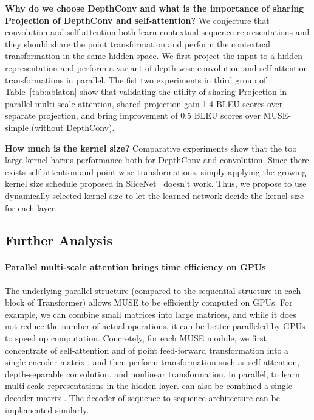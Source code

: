 \documentclass{article} \usepackage{iclr2020_conference,times}
\begin{document}
\textbf{Why do we choose DepthConv and what is the importance of sharing Projection of DepthConv and self-attention?}
We conjecture that convolution and self-attention both learn contextual sequence representations and they should share the point  transformation and perform the contextual transformation in the same hidden space. 
We first project  the input to a hidden representation  and perform a variant of  depth-wise convolution and self-attention transformations in parallel.  
The fist two experiments in third group of Table~\ref{tab:ablaton} show that  validating the utility of sharing Projection in parallel multi-scale attention, shared projection gain 1.4 BLEU scores over separate projection, and bring improvement of 0.5 BLEU scores over MUSE-simple (without DepthConv).

\textbf{How much is the kernel size?}
Comparative experiments show that the too large kernel harms performance  both for DepthConv and convolution. Since there exists self-attention and point-wise transformations, simply applying the growing kernel size schedule proposed in SliceNet~\citep{kaiser2017depthwise}  doesn't  work. Thus, we propose to use dynamically selected kernel size to let the learned network decide the kernel size for each layer.
































\subsection{Further Analysis}

\paragraph{Parallel multi-scale attention brings time efficiency on GPUs}

The underlying parallel structure (compared to the sequential structure in each block of Transformer) allows MUSE to be efficiently computed on GPUs. For example, we can combine small matrices into large matrices, and while it does not reduce the number of actual operations, it can be better paralleled by GPUs to speed up computation.  Concretely, for each MUSE module,  we  first concentrate  of self-attention and  of point feed-forward transformation into a single encoder matrix , and then perform transformation such as self-attention, depth-separable convolution, and nonlinear transformation, in parallel, to learn multi-scale representations in the hidden layer.  can also be combined a single decoder matrix  . The decoder of sequence to sequence architecture can be implemented similarly.
\end{document}
